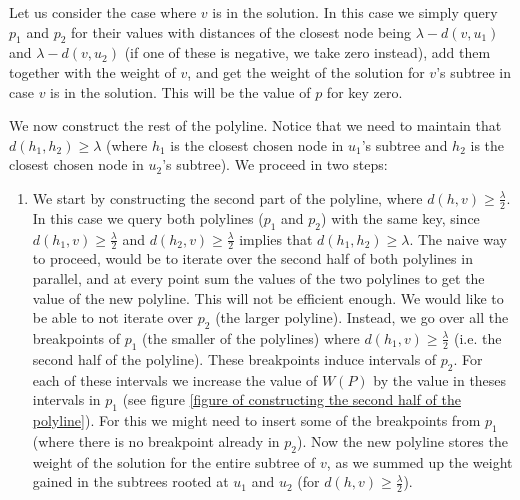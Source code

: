 \documentclass[11pt,a4paper]{article}
\theoremstyle{definition}
\theoremstyle{remark}
\begin{document}
Let us consider the case where $v$ is in the solution. In this case we simply query $p_1$ and $p_2$ for their values with distances of the closest node being $\lambda - d(v,u_1)$ and $\lambda - d(v,u_2)$ (if one of these is negative, we take zero instead), add them together with the weight of $v$, and get the weight of the solution for $v$'s subtree in case $v$ is in the solution. This will be the value of $p$ for key zero.

We now construct the rest of the polyline. Notice that we need to maintain that $d(h_1,h_2) \geq \lambda$ (where $h_1$ is the closest chosen node in $u_1$'s subtree and $h_2$ is the closest chosen node in $u_2$'s subtree). We proceed in two steps:

\begin{enumerate}
\item We start by constructing the second part of the polyline, where $d(h,v) \geq \frac{\lambda}{2}$. In this case we query both polylines ($p_1$ and $p_2$) with the same key, since $d(h_1,v) \geq \frac{\lambda}{2}$ and $d(h_2,v) \geq \frac{\lambda}{2}$ implies that $d(h_1,h_2) \geq \lambda$. The naive way to proceed, would be to iterate over the second half of both polylines in parallel, and at every point sum the values of the two polylines to get the value of the new polyline. This will not be efficient enough. We would like to be able to not iterate over $p_2$ (the larger polyline). Instead, we go over all the breakpoints of $p_1$ (the smaller of the polylines) where $d(h_1,v)\geq \frac{\lambda}{2}$ (i.e. the second half of the polyline). These breakpoints induce intervals of $p_2$. For each of these intervals we increase the value of $W(P)$ by the value in theses intervals in $p_1$ (see figure \ref{figure of constructing the second half of the polyline}). For this we might need to insert some of the breakpoints from $p_1$ (where there is no breakpoint already in $p_2$). Now the new polyline stores the weight of the solution for the entire subtree of $v$, as we summed up the weight gained in the subtrees rooted at $u_1$ and $u_2$ (for $d(h,v) \geq \frac{\lambda}{2}$). 


\end{enumerate}
\end{document}
